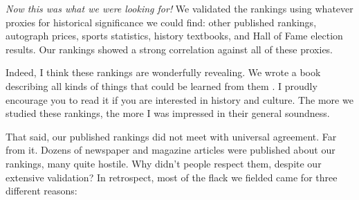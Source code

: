 \documentclass[10pt]{article}
\begin{document}
\textit{Now this was what we were looking for!} We validated the rankings using whatever proxies for historical significance we could find: other published rankings, autograph prices, sports statistics, history textbooks, and Hall of Fame election results. Our rankings showed a strong correlation against all of these proxies.

Indeed, I think these rankings are wonderfully revealing. We wrote a book describing all kinds of things that could be learned from them \cite{SW13}. I proudly encourage you to read it if you are interested in history and culture. The more we studied these rankings, the more I was impressed in their general soundness.

That said, our published rankings did not meet with universal agreement. Far from it. Dozens of newspaper and magazine articles were published about our rankings, many quite hostile. Why didn't people respect them, despite our extensive validation? In retrospect, most of the flack we fielded came for three different reasons:
\end{document}
